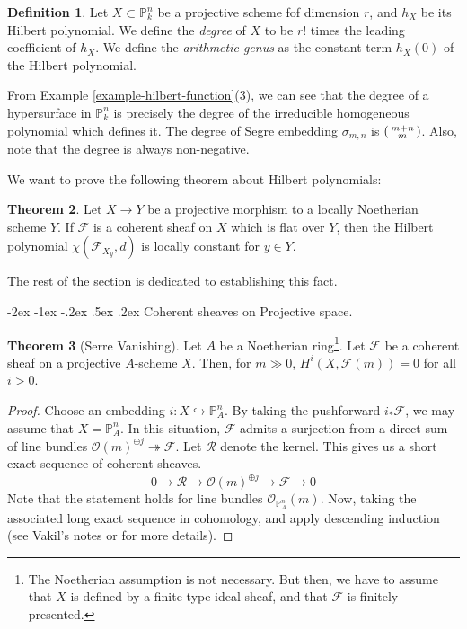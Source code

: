 \documentclass[11pt]{amsart}
\makeatletter
\renewcommand\subsection{\@startsection {subsection}{1}{\z@}%
	{-2ex \@plus -1ex \@minus -.2ex}%
	{.5ex \@plus.2ex}%
	{\normalfont\bfseries}}
\newcommand{\sF}{{\mathcal F}}
\newcommand{\sO}{{\mathcal O}}
\newcommand{\sR}{{\mathcal R}}
\renewcommand{\P}{{\mathbb P}}
\theoremstyle{definition}
\newtheorem{theorem}{Theorem}[section]
\newtheorem{definition}[theorem]{Definition}
\makeatother
\begin{document}
\begin{definition}
	Let $X\subset \P_k^n$ be a projective scheme fof dimension $r$, and $h_X$ be its Hilbert polynomial. We define the \textit{degree} of $X$ to be $r!$ times the leading coefficient of $h_X$. We define the \textit{arithmetic genus} as the constant term $h_X(0)$ of the Hilbert polynomial.
\end{definition}

From Example \ref{example-hilbert-function}(3), we can see that the degree of a hypersurface in $\P_k^n$ is precisely the degree of the irreducible homogeneous polynomial which defines it. The degree of Segre embedding $\sigma_{m,n}$ is $\begin{psmallmatrix}
	m + n \\
	m
\end{psmallmatrix}$. Also, note that the degree is always non-negative.
\medskip

We want to prove the following theorem about Hilbert polynomials:

\begin{theorem}
	\label{theorem-hilbert-polynomial-in-flat-family}
	Let $X\rightarrow Y$ be a projective morphism to a locally Noetherian scheme $Y$. If $\sF$ is a coherent sheaf on $X$ which is flat over $Y$, then the Hilbert polynomial $\chi(\sF_{X_y},d)$ is locally constant for $y\in Y$.
\end{theorem}

The rest of the section is dedicated to establishing this fact.


\subsection{Coherent sheaves on Projective space.}

\begin{theorem}[Serre Vanishing]
	\label{theorem-serre-vanishing}
	Let $A$ be a Noetherian ring\footnote{The Noetherian assumption is not necessary. But then, we have to assume that $X$ is defined by a finite type ideal sheaf, and that $\sF$ is finitely presented.}. Let $\sF$ be a coherent sheaf on a projective $A$-scheme $X$. Then, for $m\gg 0$, $H^i(X,\sF(m))=0$ for all $i>0$.
\end{theorem}
\begin{proof}
	Choose an embedding $i:X\hookrightarrow \P_A^n$. By taking the pushforward $i_*\sF$, we may assume that $X=\P_A^n$. In this situation, $\sF$ admits a surjection from a direct sum of line bundles $\sO(m)^{\oplus j}\twoheadrightarrow \sF$. Let $\sR$ denote the kernel. This gives us a short exact sequence of coherent sheaves. 
	\[0\rightarrow \sR \rightarrow\sO(m)^{\oplus j}\rightarrow \sF\rightarrow 0\]
	Note that the statement holds for line bundles $\sO_{\P_A^n}(m)$. Now, taking the associated long exact sequence in cohomology, and apply descending induction (see Vakil's notes or \cite[III, 5.2]{Hart1} for more details).
\end{proof}
\end{document}
